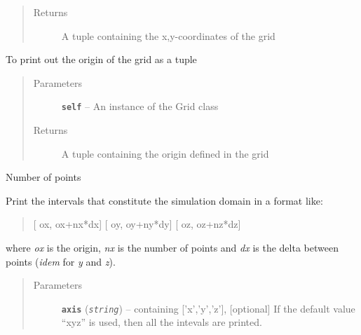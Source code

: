 \documentclass[letterpaper,10pt,english]{sphinxmanual}
\begin{document}
\begin{fulllineitems}
\begin{fulllineitems}
\begin{quote}
\begin{description}
\item[{Returns}] \leavevmode
A tuple containing the x,y-coordinates of the grid

\end{description}\end{quote}

\end{fulllineitems}


\begin{fulllineitems}
\label{hyvr:hyvr.hyvr.grid.Grid.origin}
To print out the origin of the grid as a tuple
\begin{quote}\begin{description}
\item[{Parameters}] \leavevmode
\textbf{\texttt{self}} -- An instance of the Grid class

\item[{Returns}] \leavevmode
A tuple containing the origin defined in the grid

\end{description}\end{quote}

\end{fulllineitems}


\begin{fulllineitems}
\label{hyvr:hyvr.hyvr.grid.Grid.points}
Number of points

\end{fulllineitems}


\begin{fulllineitems}
\label{hyvr:hyvr.hyvr.grid.Grid.print_intervals}
Print the intervals that constitute the simulation domain in a format like:
\begin{quote}

{[} ox, ox+nx*dx{]} {[} oy, oy+ny*dy{]} {[} oz, oz+nz*dz{]}
\end{quote}

where \emph{ox} is the origin, \emph{nx} is the number of points and \emph{dx}
is the delta between points (\emph{idem} for \emph{y} and \emph{z}).
\begin{quote}\begin{description}
\item[{Parameters}] \leavevmode
\textbf{\texttt{axis}} (\emph{\texttt{string}}) -- containing {[}'x','y','z'{]}, {[}optional{]}
If the default value ``xyz'' is used, then all the intevals are printed.


\end{description}
\end{quote}
\end{fulllineitems}
\end{fulllineitems}
\end{document}
